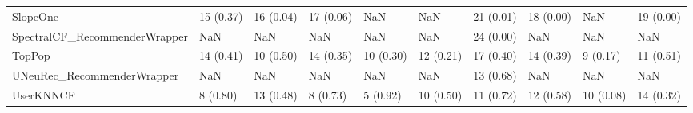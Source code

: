 \begin{tabular}{llllllllll}
                           SlopeOne &                15 (0.37) &   16 (0.04) &     17 (0.06) &          NaN &                  NaN &           21 (0.01) &         18 (0.00) &                NaN &         19 (0.00) \\
      SpectralCF\_RecommenderWrapper &                      NaN &         NaN &           NaN &          NaN &                  NaN &           24 (0.00) &               NaN &                NaN &               NaN \\
                             TopPop &                14 (0.41) &   10 (0.50) &     14 (0.35) &    10 (0.30) &            12 (0.21) &           17 (0.40) &         14 (0.39) &           9 (0.17) &         11 (0.51) \\
         UNeuRec\_RecommenderWrapper &                      NaN &         NaN &           NaN &          NaN &                  NaN &           13 (0.68) &               NaN &                NaN &               NaN \\
                          UserKNNCF &                 8 (0.80) &   13 (0.48) &      8 (0.73) &     5 (0.92) &            10 (0.50) &           11 (0.72) &         12 (0.58) &          10 (0.08) &         14 (0.32) \\
\bottomrule
\end{tabular}

